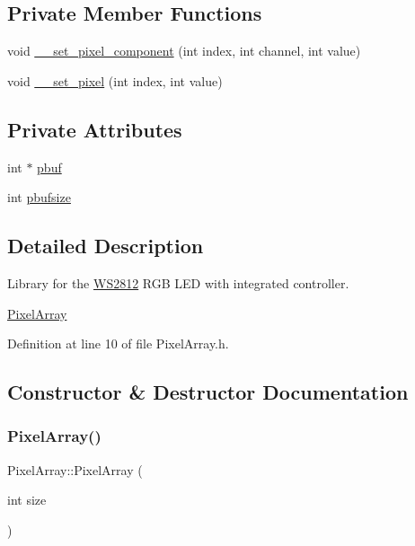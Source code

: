 \subsection*{Private Member Functions}
\begin{DoxyCompactItemize}
\item 
void \hyperlink{class_pixel_array_a42c6681bf771332826ecc9ad2a8cea02}{\+\_\+\+\_\+set\+\_\+pixel\+\_\+component} (int index, int channel, int value)
\item 
void \hyperlink{class_pixel_array_a4b1a6582bc3bab1f67aebd1f97a5595d}{\+\_\+\+\_\+set\+\_\+pixel} (int index, int value)
\end{DoxyCompactItemize}
\subsection*{Private Attributes}
\begin{DoxyCompactItemize}
\item 
int $\ast$ \hyperlink{class_pixel_array_ab0109a336e69a9942b2723e43ee715d7}{pbuf}
\item 
int \hyperlink{class_pixel_array_aca29e70f9b643bff3733ab2e694439a1}{pbufsize}
\end{DoxyCompactItemize}


\subsection{Detailed Description}
Library for the \hyperlink{class_w_s2812}{W\+S2812} R\+GB L\+ED with integrated controller. 

\hyperlink{class_pixel_array}{Pixel\+Array} 

Definition at line 10 of file Pixel\+Array.\+h.



\subsection{Constructor \& Destructor Documentation}
\mbox{\label{class_pixel_array_a86359f5eda90e0d12e3aa2c102ade21d}} 
\subsubsection{\texorpdfstring{Pixel\+Array()}{PixelArray()}}
{\footnotesize\ttfamily Pixel\+Array\+::\+Pixel\+Array (\begin{DoxyParamCaption}\item[{int}]{size }\end{DoxyParamCaption})}



